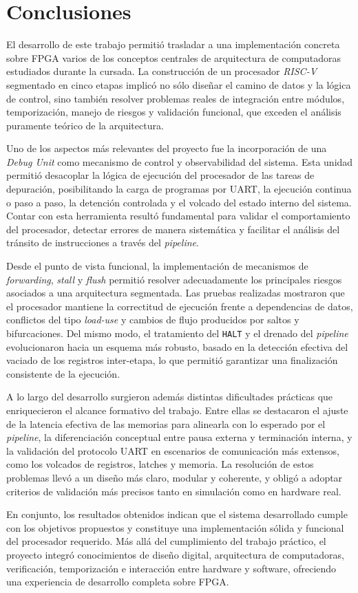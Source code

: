 \newpage

\section{Conclusiones}

El desarrollo de este trabajo permitió trasladar a una implementación concreta sobre FPGA varios de los conceptos centrales de arquitectura de computadoras estudiados durante la cursada. La construcción de un procesador \textit{RISC-V} segmentado en cinco etapas implicó no sólo diseñar el camino de datos y la lógica de control, sino también resolver problemas reales de integración entre módulos, temporización, manejo de riesgos y validación funcional, que exceden el análisis puramente teórico de la arquitectura.

Uno de los aspectos más relevantes del proyecto fue la incorporación de una \textit{Debug Unit} como mecanismo de control y observabilidad del sistema. Esta unidad permitió desacoplar la lógica de ejecución del procesador de las tareas de depuración, posibilitando la carga de programas por UART, la ejecución continua o paso a paso, la detención controlada y el volcado del estado interno del sistema. Contar con esta herramienta resultó fundamental para validar el comportamiento del procesador, detectar errores de manera sistemática y facilitar el análisis del tránsito de instrucciones a través del \textit{pipeline}.

Desde el punto de vista funcional, la implementación de mecanismos de \textit{forwarding}, \textit{stall} y \textit{flush} permitió resolver adecuadamente los principales riesgos asociados a una arquitectura segmentada. Las pruebas realizadas mostraron que el procesador mantiene la correctitud de ejecución frente a dependencias de datos, conflictos del tipo \textit{load-use} y cambios de flujo producidos por saltos y bifurcaciones. Del mismo modo, el tratamiento del \texttt{HALT} y el drenado del \textit{pipeline} evolucionaron hacia un esquema más robusto, basado en la detección efectiva del vaciado de los registros inter-etapa, lo que permitió garantizar una finalización consistente de la ejecución.

A lo largo del desarrollo surgieron además distintas dificultades prácticas que enriquecieron el alcance formativo del trabajo. Entre ellas se destacaron el ajuste de la latencia efectiva de las memorias para alinearla con lo esperado por el \textit{pipeline}, la diferenciación conceptual entre pausa externa y terminación interna, y la validación del protocolo UART en escenarios de comunicación más extensos, como los volcados de registros, latches y memoria. La resolución de estos problemas llevó a un diseño más claro, modular y coherente, y obligó a adoptar criterios de validación más precisos tanto en simulación como en hardware real.

En conjunto, los resultados obtenidos indican que el sistema desarrollado cumple con los objetivos propuestos y constituye una implementación sólida y funcional del procesador requerido. Más allá del cumplimiento del trabajo práctico, el proyecto integró conocimientos de diseño digital, arquitectura de computadoras, verificación, temporización e interacción entre hardware y software, ofreciendo una experiencia de desarrollo completa sobre FPGA.